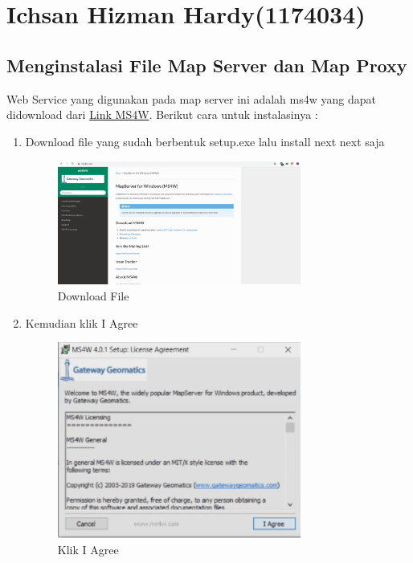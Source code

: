 \section{Ichsan Hizman Hardy(1174034)}
\subsection{Menginstalasi File Map Server dan Map Proxy}
Web Service yang digunakan pada map server ini adalah ms4w yang dapat didownload dari \href{https://ms4w.com/}{Link MS4W}.
Berikut cara untuk instalasinya : 
\begin{enumerate}
    \item Download file yang sudah berbentuk setup.exe lalu install next next saja
    \hfill\break
	\begin{figure}[H]
		\includegraphics[width=8cm]{figures/1174034/1174034/8.PNG}
		\centering
		\caption{Download File}
	\end{figure}
	
    \item Kemudian klik I Agree
    \hfill\break
	\begin{figure}[H]
		\includegraphics[width=8cm]{figures/1174034/1174034/1.PNG}
		\centering
		\caption{Klik I Agree}
	\end{figure}
	

\end{enumerate}
